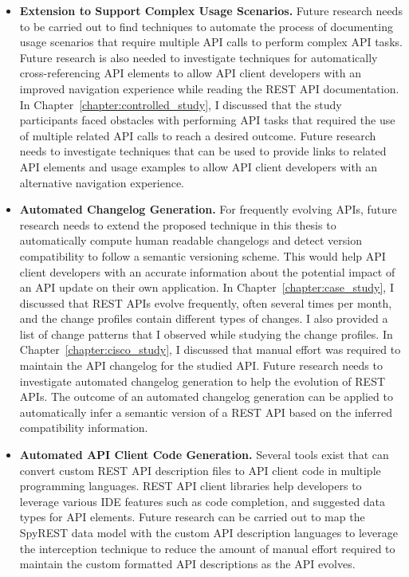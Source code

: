\documentclass[12pt]{ucalgthes1}
\begin{document}
\begin{itemize}
  \item \textbf{Extension to Support Complex Usage Scenarios.} Future research needs to be carried out to find techniques to automate the process of documenting usage scenarios that require multiple API calls to perform complex API tasks. Future research is also needed to investigate techniques for automatically cross-referencing API elements to allow API client developers with an improved navigation experience while reading the REST API documentation. In Chapter~\ref{chapter:controlled_study}, I discussed that the study participants faced obstacles with performing API tasks that required the use of multiple related API calls to reach a desired outcome. Future research needs to investigate techniques that can be used to provide links to related API elements and usage examples to allow API client developers with an alternative navigation experience.
  \item \textbf{Automated Changelog Generation.} For frequently evolving APIs, future research needs to extend the proposed technique in this thesis to automatically compute human readable changelogs and detect version compatibility to follow a semantic versioning scheme. This would help API client developers with an accurate information about the potential impact of an API update on their own application. In Chapter~\ref{chapter:case_study}, I discussed that REST APIs evolve frequently, often several times per month, and the change profiles contain different types of changes. I also provided a list of change patterns that I observed while studying the change profiles. In Chapter~\ref{chapter:cisco_study}, I discussed that manual effort was required to maintain the API changelog for the studied API. Future research needs to investigate automated changelog generation to help the evolution of REST APIs. The outcome of an automated changelog generation can be applied to automatically infer a semantic version of a REST API based on the inferred compatibility information.
  \item \textbf{Automated API Client Code Generation.} Several tools exist that can convert custom REST API description files to API client code in multiple programming languages. REST API client libraries help developers to leverage various IDE features such as code completion, and suggested data types for API elements. Future research can be carried out to map the SpyREST data model with the custom API description languages to leverage the interception technique to reduce the amount of manual effort required to maintain the custom formatted API descriptions as the API evolves.

\end{itemize}
\end{document}
